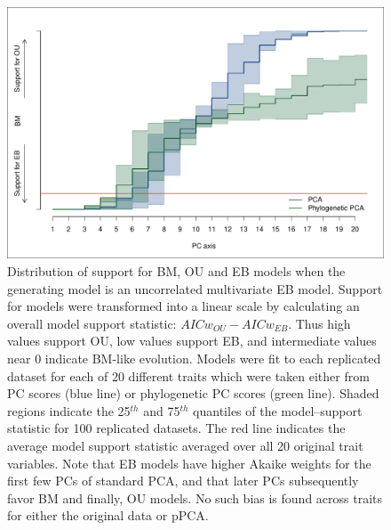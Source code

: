 \documentclass[a4paper,11pt]{article}
\begin{document}
\begin{figure}[p]
\centering
\includegraphics[scale=0.65]{./fig/uncor-eb-aic.pdf}
\caption{Distribution of support for BM, OU and EB models when the generating model is an uncorrelated multivariate EB model. Support for models were transformed into a linear scale by calculating an overall model support statistic: $AICw_{OU} - AICw_{EB}$. Thus high values support OU, low values support EB, and intermediate values near 0 indicate BM-like evolution. Models were fit to each replicated dataset for each of 20 different traits which were taken either from PC scores (blue line) or phylogenetic PC scores (green line). Shaded regions indicate the 25$^{th}$ and 75$^{th}$ quantiles of the model--support statistic for 100 replicated datasets. The red  line indicates the average model support statistic averaged over all 20 original trait variables. Note that EB models have higher Akaike weights for the first few PCs of standard PCA, and that later PCs subsequently favor BM and finally, OU models. No such bias is found across traits for either the original data or pPCA.}
\label{aicweb}
\end{figure}
\end{document}
